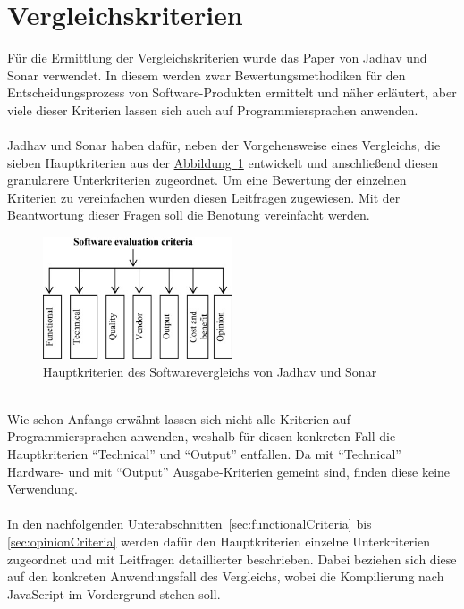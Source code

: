 \section{Vergleichskriterien}\label{sec:comparisonCriteria}
Für die Ermittlung der Vergleichskriterien wurde das Paper \cite{frameworkEvaluation} von Jadhav und Sonar verwendet. In diesem werden zwar Bewertungsmethodiken für den Entscheidungsprozess von Software-Produkten ermittelt und näher erläutert, aber viele dieser Kriterien lassen sich auch auf Programmiersprachen anwenden. \\
\\
Jadhav und Sonar haben dafür, neben der Vorgehensweise eines Vergleichs, die sieben Hauptkriterien aus der \hyperref[fig:comparisionCriteria]{Abbildung~\ref{fig:comparisionCriteria}} entwickelt und anschließend diesen granularere Unterkriterien zugeordnet. Um eine Bewertung der einzelnen Kriterien zu vereinfachen wurden diesen Leitfragen zugewiesen. Mit der Beantwortung dieser Fragen soll die Benotung vereinfacht werden.\\
\begin{figure}[htb]
	\includegraphics[width=0.5\textwidth]{images/comparision-criteria.jpg}
	\caption{Hauptkriterien des Softwarevergleichs von Jadhav und Sonar \cite{frameworkEvaluation}}
	\label{fig:comparisionCriteria}
\end{figure}
\\
Wie schon Anfangs erwähnt lassen sich nicht alle Kriterien auf Programmiersprachen anwenden, weshalb für diesen konkreten Fall die Hauptkriterien \enquote{Technical} und \enquote{Output} entfallen. Da mit \enquote{Technical} Hardware- und mit \enquote{Output} Ausgabe-Kriterien gemeint sind, finden diese keine Verwendung.\\
\\
In den nachfolgenden \hyperref[sec:functionalCriteria, sec:opinionCriteria]{Unterabschnitten~\ref{sec:functionalCriteria} bis \ref{sec:opinionCriteria}} werden dafür den Hauptkriterien einzelne Unterkriterien zugeordnet und mit Leitfragen detaillierter beschrieben. Dabei beziehen sich diese auf den konkreten Anwendungsfall des Vergleichs, wobei die Kompilierung nach JavaScript im Vordergrund stehen soll.
 
